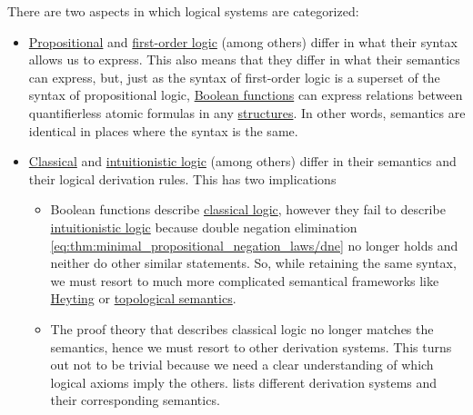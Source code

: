 There are two aspects in which logical systems are categorized:
\begin{itemize}
  \item \hyperref[subsec:propositional_logic]{Propositional} and \hyperref[subsec:first_order_logic]{first-order logic} (among others) differ in what their syntax allows us to express. This also means that they differ in what their semantics can express, but, just as the syntax of first-order logic is a superset of the syntax of propositional logic, \hyperref[subsec:boolean_functions]{Boolean functions} can express relations between quantifierless atomic formulas in any \hyperref[def:first_order_structure]{structures}. In other words, semantics are identical in places where the syntax is the same.

  \item \hyperref[def:classical_logic]{Classical} and \hyperref[def:intuitionistic_logic]{intuitionistic logic} (among others) differ in their semantics and their logical derivation rules. This has two implications
  \begin{itemize}
     \item Boolean functions describe \hyperref[def:classical_logic]{classical logic}, however they fail to describe \hyperref[def:intuitionistic_logic]{intuitionistic logic} because double negation elimination \eqref{eq:thm:minimal_propositional_negation_laws/dne} no longer holds and neither do other similar statements. So, while retaining the same syntax, we must resort to much more complicated semantical frameworks like \hyperref[def:propositional_heyting_algebra_semantics]{Heyting} or \hyperref[def:propositional_topological_semantics]{topological semantics}.

     \item The proof theory that describes classical logic no longer matches the semantics, hence we must resort to other derivation systems. This turns out not to be trivial because we need a clear understanding of which logical axioms imply the others.  lists different derivation systems and their corresponding semantics.
  \end{itemize}
\end{itemize}

